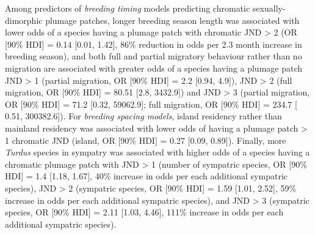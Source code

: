 \documentclass[
  a4paper,
]{article}
\begin{document}
Among predictors of \emph{breeding timing} models predicting chromatic
sexually-dimorphic plumage patches, longer breeding season length was
associated with lower odds of a species having a plumage patch with
chromatic JND \textgreater{} 2 (OR {[}90\% HDI{]} = 0.14 {[}0.01,
1.42{]}, 86\% reduction in odds per 2.3 month increase in breeding
season), and both full and partial migratory behaviour rather than no
migration are associated with greater odds of a species having a plumage
patch JND \textgreater{} 1 (partial migration, OR {[}90\% HDI{]} = 2.2
{[}0.94, 4.9{]}), JND \textgreater{} 2 (full migration, OR {[}90\%
HDI{]} = 80.51 {[}2.8, 3432.9{]}) and JND \textgreater{} 3 (partial
migration, OR {[}90\% HDI{]} = 71.2 {[}0.32, 59062.9{]}; full migration,
OR {[}90\% HDI{]} = 234.7 {[} 0.51, 300382.6{]}). For \emph{breeding
spacing models}, island residency rather than mainland residency was
associated with lower odds of having a plumage patch \textgreater{} 1
chromatic JND (island, OR {[}90\% HDI{]} = 0.27 {[}0.09, 0.89{]}).
Finally, more \emph{Turdus} species in sympatry was associated with
higher odds of a species having a chromatic plumage patch with JND
\textgreater{} 1 (number of sympatric species, OR {[}90\% HDI{]} = 1.4
{[}1.18, 1.67{]}, 40\% increase in odds per each additional sympatric
species), JND \textgreater{} 2 (sympatric species, OR {[}90\% HDI{]} =
1.59 {[}1.01, 2.52{]}, 59\% increase in odds per each additional
sympatric species), and JND \textgreater{} 3 (sympatric species, OR
{[}90\% HDI{]} = 2.11 {[}1.03, 4.46{]}, 111\% increase in odds per each
additional sympatric species).
\end{document}
